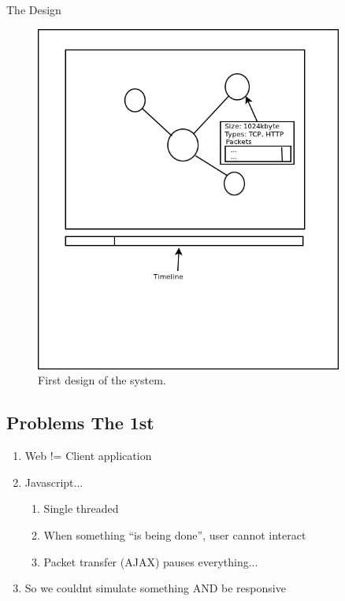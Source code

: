 \documentclass{beamer}
\begin{document}
\begin{frame}{The Design}
 \begin{figure}
 \centering
 \includegraphics[width=0.9\textwidth]{./img/draft1.png}
 \caption{First design of the system.}
 \label{fig:draft1}
\end{figure}
\end{frame}



\subsection{Problems The 1st}

\begin{frame}
 \begin{enumerate}
  \item Web != Client application
  \item Javascript...
  \begin{enumerate}
   \item Single threaded
   \item When something ``is being done'', user cannot interact
   \item Packet transfer (AJAX) pauses everything...
  \end{enumerate}
  \item So we couldnt simulate something AND be responsive

 \end{enumerate}

\end{frame}
\end{document}
